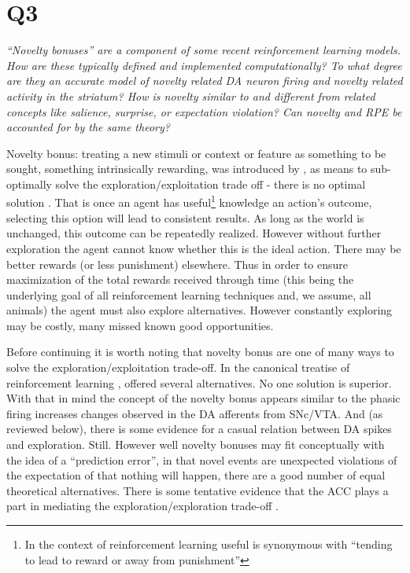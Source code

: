 \documentclass[doc]{apa}        %
\begin{document}
\newpage
\section{Q3} %
\label{sec:q3}
\emph{“Novelty bonuses” are a component of some recent reinforcement learning models.    How are these typically defined and implemented computationally?  To what degree are they an accurate model of novelty related DA neuron firing and novelty related activity in the striatum?    How is novelty similar to and different from related concepts like salience, surprise, or expectation violation?   Can novelty and RPE be accounted for by the same theory? }

Novelty bonus: treating a new stimuli or context or feature as something to be sought, something intrinsically rewarding, was introduced by , as means to sub-optimally solve the exploration/exploitation trade off - there is no optimal solution \cite{Dayan:1996p7238}.  That is once an agent has useful\footnote{In the context of reinforcement learning useful is synonymous with ``tending to lead to reward or away from punishment'' } knowledge an action's outcome, selecting this option will lead to consistent results.  As long as the world is unchanged, this outcome can be repeatedly realized.  However without further exploration the agent cannot know whether this is the ideal action.  There may be better rewards (or less punishment) elsewhere.  Thus in order to ensure maximization of the total rewards received through time (this being the underlying goal of all reinforcement learning techniques and, we assume, all animals) the agent must also explore alternatives.  However constantly exploring may be costly, many missed known good opportunities.  

Before continuing it is worth noting that novelty bonus are one of many ways to solve the exploration/exploitation trade-off.  In the canonical treatise of reinforcement learning , offered several alternatives.  No one solution is superior.  With that in mind the concept of the novelty bonus appears similar to the phasic firing increases changes observed in the DA afferents from SNc/VTA.  And (as reviewed below), there is some evidence for a casual relation between DA spikes and exploration.  Still. However well novelty bonuses may fit conceptually with the idea of a ``prediction error'', in that novel events are unexpected violations of the expectation of that nothing will happen, there are a good number of equal theoretical alternatives.  There is some tentative evidence that the ACC plays a part in mediating the exploration/exploration trade-off \cite{Quilodran:2008p2645}.
\end{document}

